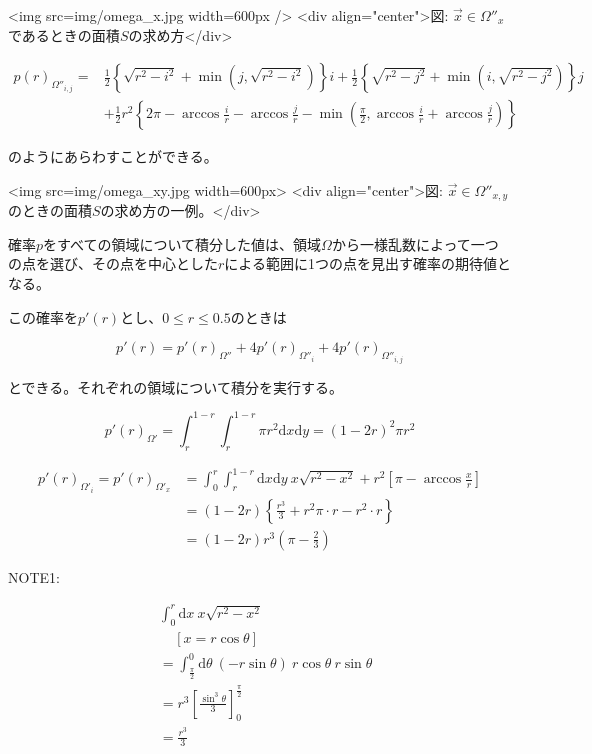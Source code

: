 <img src=img/omega_x.jpg width=600px />
<div align="center">図: $\vec{x} \in \Omega''_{x}$であるときの面積$S$の求め方</div>

$$\begin{align}p(r)_{\Omega''_{i,j}} = &\frac{1}{2}\left\{ \sqrt{r^{2}-i^{2}} + \min \left(j, \sqrt{r^{2}-i^{2}}\right) \right\}i + \frac{1}{2}\left\{ \sqrt{r^{2}-j^{2}} + \min \left( i, \sqrt{r^{2}-j^{2}}\right) \right\}j \\
&+ \frac{1}{2}r^{2} \left\{ 2\pi -\arccos \frac{i}{r}-\arccos \frac{j}{r}-\min \left( \frac{\pi}{2}, \arccos \frac{i}{r} +\arccos \frac{j}{r} \right) \right\}
\end{align}$$

のようにあらわすことができる。

<img src=img/omega_xy.jpg width=600px>
<div align="center">図: $\vec{x} \in \Omega''_{x,y}$のときの面積$S$の求め方の一例。</div>

確率$p$をすべての領域について積分した値は、領域$\Omega$から一様乱数によって一つの点を選び、その点を中心とした$r$による範囲に1つの点を見出す確率の期待値となる。

この確率を$p'(r)$とし、$0\le r \le 0.5$のときは

$$p'(r) = p'(r)_{\Omega''} + 4p'(r)_{\Omega''_{i}} + 4p'(r)_{\Omega''_{i,j}}$$

とできる。それぞれの領域について積分を実行する。

$$p'(r)_{\Omega'} = \int_{r}^{1-r} \int_{r}^{1-r}\pi r^{2}\mathrm{d}x\mathrm{d}y = (1-2r)^{2}\pi r^{2}$$

$$\begin{align}
p'(r)_{\Omega'_{i}} = p'(r)_{\Omega'_{x}} &= \int_{0}^{r} \int_{r}^{1-r}\mathrm{d}x\mathrm{d}y\ x\sqrt{r^{2}-x^{2}} + r^{2}\left[\pi - \arccos\frac{x}{r}\right]\\
&= (1-2r)\left\{ \frac{r^{3}}{3} + r^{2}\pi\cdot r - r^{2}\cdot r \right\}\\
&= (1-2r)r^{3}\left( \pi-\frac{2}{3} \right)
\end{align}$$

NOTE1:

$$\begin{align}
&\int_{0}^{r}\mathrm{d}x\ x\sqrt{r^{2}-x^{2}} \\
&\ \ \ \ \ \left[x = r\cos \theta \right]\\
&= \int_{\frac{\pi}{2}}^{0}\mathrm{d}\theta\ (-r\sin\theta)\ r\cos\theta\ r\sin\theta\\
&= r^{3}\left[ \frac{\sin^{3}\theta}{3}\right]^{\frac{\pi}{2}}_{0} \\
&= \frac{r^{3}}{3}
\end{align}$$

